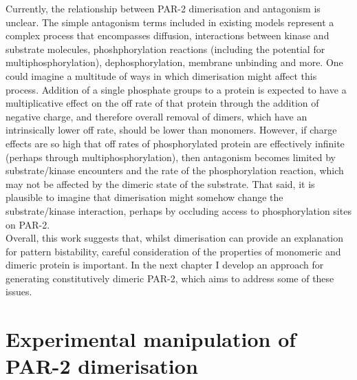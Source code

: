 \documentclass[12pt]{"report"}
\begin{document}
Currently, the relationship between PAR-2 dimerisation and antagonism is unclear. The simple antagonism terms included in existing models represent a complex process that encompasses diffusion, interactions between kinase and substrate molecules, phoshphorylation reactions (including the potential for multiphosphorylation), dephosphorylation, membrane unbinding and more. One could imagine a multitude of ways in which dimerisation might affect this process. Addition of a single phosphate groups to a protein is expected to have a multiplicative effect on the off rate of that protein through the addition of negative charge, and therefore overall removal of dimers, which have an intrinsically lower off rate, should be lower than monomers. However, if charge effects are so high that off rates of phosphorylated protein are effectively infinite (perhaps through multiphosphorylation), then antagonism becomes limited by substrate/kinase encounters and the rate of the phosphorylation reaction, which may not be affected by the dimeric state of the substrate. That said, it is plausible to imagine that dimerisation might somehow change the substrate/kinase interaction, perhaps by occluding access to phosphorylation sites on PAR-2.\\

Overall, this work suggests that, whilst dimerisation can provide an explanation for pattern bistability, careful consideration of the properties of monomeric and dimeric protein is important. In the next chapter I develop an approach for generating constitutively dimeric PAR-2, which aims to address some of these issues. \\






\clearpage
\chapter{Experimental manipulation of PAR-2 dimerisation}
\end{document}
